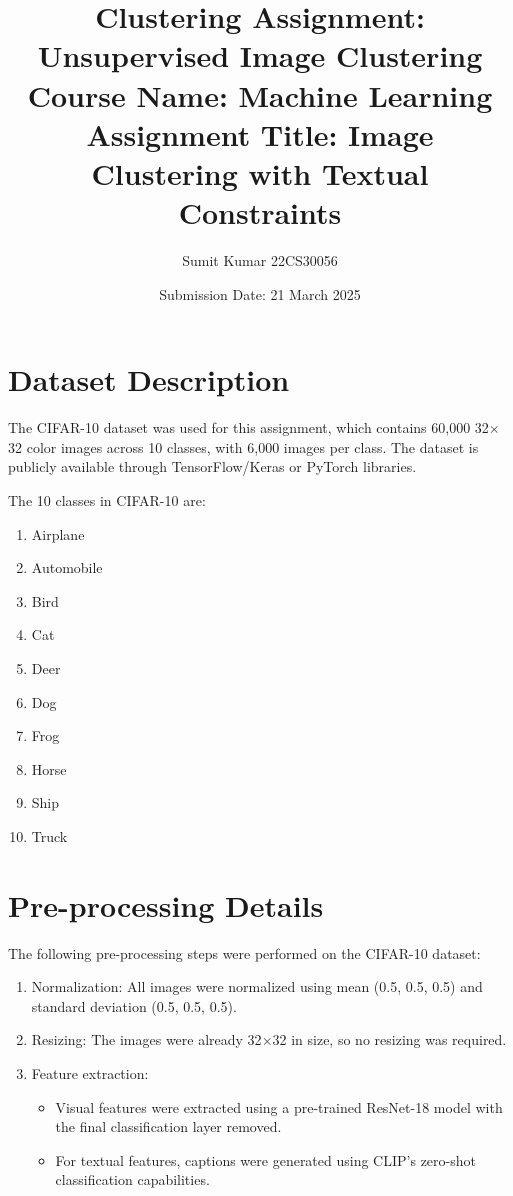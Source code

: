 \documentclass[12pt]{article}
\title{{\Large Clustering Assignment: Unsupervised Image Clustering}\\
  {\large Course Name: Machine Learning}\\
  {\large Assignment Title: Image Clustering with Textual Constraints}}
\author{Sumit Kumar 22CS30056}
\date{Submission Date: 21 March 2025}
\begin{document}
\maketitle

\tableofcontents
\newpage

\section{Dataset Description}
The CIFAR-10 dataset was used for this assignment, which contains 60,000 32$\times$32 color images across 10 classes, with 6,000 images per class. The dataset is publicly available through TensorFlow/Keras or PyTorch libraries.

The 10 classes in CIFAR-10 are:
\begin{enumerate}
    \item Airplane
    \item Automobile
    \item Bird
    \item Cat
    \item Deer
    \item Dog
    \item Frog
    \item Horse
    \item Ship
    \item Truck
\end{enumerate}

\section{Pre-processing Details}
The following pre-processing steps were performed on the CIFAR-10 dataset:

\begin{enumerate}
    \item Normalization: All images were normalized using mean (0.5, 0.5, 0.5) and standard deviation (0.5, 0.5, 0.5).
    \item Resizing: The images were already 32$\times$32 in size, so no resizing was required.
    \item Feature extraction: 
    \begin{itemize}
        \item Visual features were extracted using a pre-trained ResNet-18 model with the final classification layer removed.
        \item For textual features, captions were generated using CLIP's zero-shot classification capabilities.
    \end{itemize}
\end{enumerate}
\end{document}
